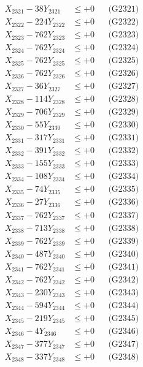 \documentclass[a4paper,10pt]{article}
\begin{document}
{\begin{align}
\allowbreak
X_{2321} - 38Y_{2321} &\leq +0 && \text{(G2321)} \\
X_{2322} - 224Y_{2322} &\leq +0 && \text{(G2322)} \\
X_{2323} - 762Y_{2323} &\leq +0 && \text{(G2323)} \\
X_{2324} - 762Y_{2324} &\leq +0 && \text{(G2324)} \\
X_{2325} - 762Y_{2325} &\leq +0 && \text{(G2325)} \\
X_{2326} - 762Y_{2326} &\leq +0 && \text{(G2326)} \\
X_{2327} - 36Y_{2327} &\leq +0 && \text{(G2327)} \\
X_{2328} - 114Y_{2328} &\leq +0 && \text{(G2328)} \\
X_{2329} - 706Y_{2329} &\leq +0 && \text{(G2329)} \\
X_{2330} - 55Y_{2330} &\leq +0 && \text{(G2330)} \\
\allowbreak
X_{2331} - 317Y_{2331} &\leq +0 && \text{(G2331)} \\
X_{2332} - 391Y_{2332} &\leq +0 && \text{(G2332)} \\
X_{2333} - 155Y_{2333} &\leq +0 && \text{(G2333)} \\
X_{2334} - 108Y_{2334} &\leq +0 && \text{(G2334)} \\
X_{2335} - 74Y_{2335} &\leq +0 && \text{(G2335)} \\
X_{2336} - 27Y_{2336} &\leq +0 && \text{(G2336)} \\
X_{2337} - 762Y_{2337} &\leq +0 && \text{(G2337)} \\
X_{2338} - 713Y_{2338} &\leq +0 && \text{(G2338)} \\
X_{2339} - 762Y_{2339} &\leq +0 && \text{(G2339)} \\
X_{2340} - 487Y_{2340} &\leq +0 && \text{(G2340)} \\
\allowbreak
X_{2341} - 762Y_{2341} &\leq +0 && \text{(G2341)} \\
X_{2342} - 762Y_{2342} &\leq +0 && \text{(G2342)} \\
X_{2343} - 230Y_{2343} &\leq +0 && \text{(G2343)} \\
X_{2344} - 594Y_{2344} &\leq +0 && \text{(G2344)} \\
X_{2345} - 219Y_{2345} &\leq +0 && \text{(G2345)} \\
X_{2346} - 4Y_{2346} &\leq +0 && \text{(G2346)} \\
X_{2347} - 377Y_{2347} &\leq +0 && \text{(G2347)} \\
X_{2348} - 337Y_{2348} &\leq +0 && \text{(G2348)} \\

\end{align}}
\end{document}
